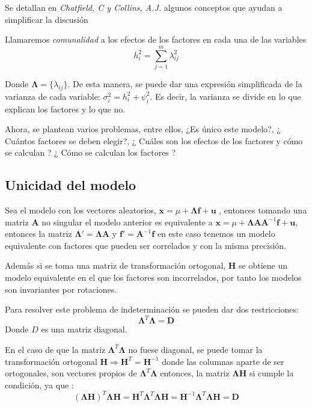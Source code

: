 \noindent Se detallan en \emph{Chatfield, C y Collins, A.J. }\cite{Chatfield 1989} algunos conceptos que ayudan a simplificar la discusión 
\begin{defi}
Llamaremos \emph{comunalidad} a los efectos de los factores en cada una de las variables 
\begin{equation}
h_i^2=\sum_{j=1}^m \lambda_{ij}^2
\end{equation}
\end{defi}
\noindent Donde $\mathbf{\Lambda}=\lbrace\lambda_{ij}\rbrace$. De esta manera, se puede dar una expresión simplificada de la varianza de cada variable: $\sigma^2_i =h_i^2+\psi_i^2$. Es decir, la varianza se divide en lo que explican los factores y lo que no. 

\noindent Ahora, se plantean varios problemas, entre ellos, ¿Es único este modelo?, ¿ Cuántos factores se deben elegir?, ¿ Cuáles son los efectos de los factores y cómo se calculan ? ¿ Cómo se calculan los factores ? 

\subsection{Unicidad del modelo }

\noindent Sea el modelo con los vectores aleatorios, $\textbf{x}=\mu+\mathbf{\Lambda} \textbf{f}+\textbf{u}$ , entonces tomando una matriz $\textbf{A}$ no singular el modelo anterior es equivalente a $\textbf{x}=\mu+\mathbf{\Lambda} \textbf{A}\textbf{A}^{-1} \textbf{f}+\textbf{u}$, entonces la matriz $\mathbf{\Lambda}'=\mathbf{\Lambda} \textbf{A}$ y $\textbf{f}'=\textbf{A}^{-1}\textbf{f}$ en este caso tenemos un modelo equivalente con factores que pueden ser correlados y con la misma precisión. 

\noindent Además si se toma una matriz de transformación ortogonal, \textbf{H} se obtiene un modelo equivalente en el que los factores son incorrelados, por tanto los modelos son invariantes por rotaciones. 

\noindent Para resolver este problema de indeterminación  se pueden dar dos restricciones:
\begin{equation}\label{Condicion FP}
\mathbf{\Lambda}^T\mathbf{\Lambda}=\textbf{D} 
\end{equation} 
\noindent Donde $D$ es una matriz diagonal. 

\noindent En el caso de que la matriz $\mathbf{\Lambda}^T\mathbf{\Lambda}$ no fuese diagonal, se puede tomar la transformación ortogonal $\textbf{H}\Rightarrow \textbf{H}^T=\textbf{H}^{-1}$ donde las columnas aparte de ser ortogonales, son vectores propios de $\mathbf{\Lambda}^T\mathbf{\Lambda}$ entonces, la matriz $\mathbf{\Lambda}\textbf{H}$ si cumple la condición, ya que :
\begin{equation}
(\mathbf{\Lambda}\textbf{H})^T\mathbf{\Lambda}\textbf{H}=\textbf{H}^T\mathbf{\Lambda}^T \mathbf{\Lambda}\textbf{H}=\textbf{H}^{-1}\mathbf{\Lambda}^T \mathbf{\Lambda}\textbf{H}=\textbf{D}
\end{equation}

